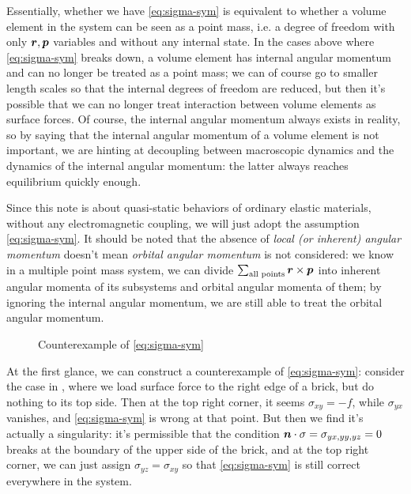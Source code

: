 \documentclass[hyperref, a4paper]{article}
\begin{document}
Essentially, whether we have \eqref{eq:sigma-sym} 
is equivalent to whether a volume element in the system 
can be seen as a point mass, 
i.e. a degree of freedom with only $\vb*{r}, \vb*{p}$ variables 
and without any internal state.
In the cases above where \eqref{eq:sigma-sym} breaks down, 
a volume element has internal angular momentum and 
can no longer be treated as a point mass; 
we can of course go to smaller length scales 
so that the internal degrees of freedom are reduced, 
but then it's possible that we can no longer treat 
interaction between volume elements as surface forces. 
Of course, the internal angular momentum always exists in reality,
so by saying that the internal angular momentum of a volume element is not important,
we are hinting at decoupling between 
macroscopic dynamics and the dynamics of the internal angular momentum:
the latter always reaches equilibrium quickly enough.

Since this note is about quasi-static behaviors of ordinary elastic materials,
without any electromagnetic coupling,
we will just adopt the assumption \eqref{eq:sigma-sym}.
It should be noted that the absence of \emph{local (or inherent) angular momentum} 
doesn't mean \emph{orbital angular momentum} is not considered: 
we know in a multiple point mass system, 
we can divide $\sum_{\text{all points}} \vb*{r} \times \vb*{p}$
into inherent angular momenta of its subsystems 
and orbital angular momenta of them; 
by ignoring the internal angular momentum, 
we are still able to treat the orbital angular momentum.

\begin{figure}
    \centering
    
    \caption{Counterexample of \eqref{eq:sigma-sym}}
    \label{fig:sigma-sym-counterexample}
\end{figure}

At the first glance, 
we can construct a counterexample of \eqref{eq:sigma-sym}: 
consider the case in ,
where we load surface force to the right edge of a brick,
but do nothing to its top side.
Then at the top right corner, 
it seems $\sigma_{xy} = - f$,
while $\sigma_{yx}$ vanishes,
and \eqref{eq:sigma-sym} is wrong at that point.
But then we find it's actually a singularity: 
it's permissible that 
the condition $\vb*{n} \cdot \sigma = \sigma_{yx, yy, yz} = 0$
breaks at the boundary of the upper side of the brick, 
and at the top right corner, 
we can just assign $\sigma_{yz} = \sigma_{xy}$ 
so that \eqref{eq:sigma-sym} is still correct everywhere in the system.
\end{document}
